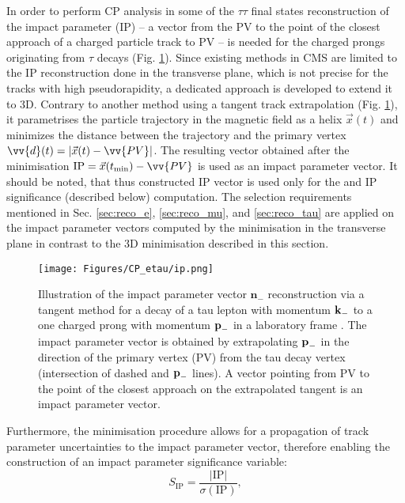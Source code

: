 In order to perform CP analysis in some of the $\tau\tau$ final states reconstruction of the impact parameter (IP) -- a vector from the PV to the point of the closest approach of a charged particle track to PV -- is needed for the charged prongs originating from $\tau$ decays  (Fig. \ref{fig:ip}). Since existing methods in CMS are limited to the IP reconstruction done in the transverse plane, which is not precise for the tracks with high pseudorapidity, a dedicated approach is developed to extend it to 3D. Contrary to another method using a tangent track extrapolation (Fig. \ref{fig:ip}), it parametrises the particle trajectory in the magnetic field as a helix $\vec{x}(t)$ and minimizes the distance between the trajectory and the primary vertex $\vv{d}(t) = |\vec{x}(t) - \vv{PV}|$. The resulting vector obtained after the minimisation $\text{IP} = \vec{x}(t_{\text{min}}) - \vv{PV}$ is used as an impact parameter vector. It should be noted, that thus constructed IP vector is used only for the \phicp and IP significance (described below) computation. The selection requirements mentioned in Sec. \ref{sec:reco_e}, \ref{sec:reco_mu}, and \ref{sec:reco_tau} are applied on the impact parameter vectors computed by the minimisation in the transverse plane in contrast to the 3D minimisation described in this section.

\begin{figure}[t!]
    \centering
    \texttt{[image: Figures/CP\_etau/ip.png]}
    \caption{Illustration of the impact parameter vector $\boldsymbol{n}_-$ reconstruction via a tangent method for a decay of a tau lepton with momentum $\text{\textbf{k}}_-$ to a one charged prong with momentum $\text{\textbf{p}}_-$ in a laboratory frame \cite{Berge:2008dr}. The impact parameter vector is obtained by extrapolating $\text{\textbf{p}}_-$ in the direction of the primary vertex (PV) from the tau decay vertex (intersection of dashed and $\text{\textbf{p}}_-$ lines). A vector pointing from PV to the point of the closest approach on the extrapolated tangent is an impact parameter vector.}
    \label{fig:ip}
\end{figure}

Furthermore, the minimisation procedure allows for a propagation of track parameter uncertainties to the impact parameter vector, therefore enabling the construction of an impact parameter significance variable:
\begin{equation}
S_{\text{IP}} = \dfrac{|\text{IP}|}{\sigma(\text{IP})},
\end{equation}

